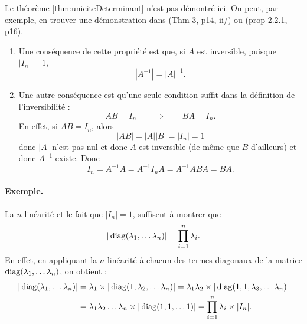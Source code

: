 Le théorème \ref{thm:uniciteDeterminant} n'est pas démontré ici. On peut, par exemple, en trouver une démonstration dans \cite{GAJ94} (Thm 3, p14, ii/) ou \cite{Ser01} (prop 2.2.1, p16).
\eproof

\remarks 
\begin{enumerate}
  \item Une conséquence de cette propriété est que, si $A$ est inversible, puisque $|I_n| = 1$,
  $$
  |A^{-1}| = |A|^{-1}.
  $$
  \item Une autre conséquence est qu'une seule condition suffit dans la définition de l'inversibilité : 
  $$
  AB = I_n \qquad \Rightarrow \qquad BA = I_n.
  $$
  En effet, si $AB = I_n$, alors
  $$
  |AB| = |A| |B| = |I_n| = 1
  $$
  donc $|A|$ n'est pas nul et donc $A$ est inversible (de même que $B$ d'ailleurs) et donc $A^{-1}$ existe. Donc
  $$
  I_n = A^{-1} A = A^{-1} I_n A = A^{-1} A B A = B A.
  $$
\end{enumerate}

\paragraph*{Exemple.}
La $n$-linéarité et le fait que $|I_n| = 1$, suffisent à montrer que 
\begin{equation} \label{eq:determiantMatriceDiagonale}
|\operatorname{diag}(\lambda_1, \dots \lambda_n)| = \prod_{i = 1}^n \lambda_i.
\end{equation}
En effet, en appliquant la $n$-linéarité à chacun des termes diagonaux de la matrice $\operatorname{diag}(\lambda_1, \dots \lambda_n)$, on obtient : 
\begin{align*}
|\operatorname{diag}(\lambda_1, \dots \lambda_n)| 
& = \lambda_1 \times |\operatorname{diag}(1, \lambda_2, \dots \lambda_n)|
= \lambda_1 \lambda_2 \times |\operatorname{diag}(1, 1, \lambda_3, \dots \lambda_n)| \\
& = \lambda_1 \lambda_2 \dots \lambda_n \times |\operatorname{diag}(1, 1, \dots 1)|
= \prod_{i=1}^n \lambda_i \times |I_n|.
\end{align*}

